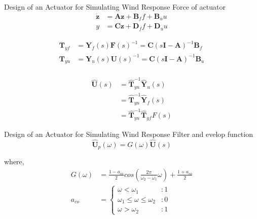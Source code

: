 \documentclass[usepdftitle=false]{beamer}
\newcommand{\matr}[1]{\mathbf{#1}}
\begin{document}
\begin{frame}{Design of an Actuator for Simulating Wind Response}
Force of actuator
\begin{equation}
\begin{aligned}
\dot{\matr{z}} &=\matr{A}\matr{z}+\matr{B}_{f}f + \matr{B}_{u}u \\
y &= \matr{C}\matr{z}+\matr{D}_{f}f+\matr{D}_{u}u
\end{aligned}
\label{eq:6-1}
\end{equation}

\begin{equation}
\begin{aligned}
\matr{T}_{yf} &= \matr{Y}_{f}(s)\matr{F}(s)^{-1} = \matr{C}\left(s\matr{I}-\matr{A}\right)^{-1}\matr{B}_{f} \\
\matr{T}_{yu} &= \matr{Y}_{u}(s)\matr{U}(s)^{-1} = \matr{C}\left(s\matr{I}-\matr{A}\right)^{-1}\matr{B}_{u} \\
\end{aligned}
\label{eq:6-2}
\end{equation}

\begin{equation}
\begin{aligned}
\hat{\matr{U}}(s)&=\hat{\matr{T}}_{yu}^{-1}\hat{\matr{Y}}_{u}(s)\\
&=\hat{\matr{T}}_{yu}^{-1}\hat{\matr{Y}}_{f}(s)\\
&=\hat{\matr{T}}_{yu}^{-1}\hat{\matr{T}}_{yf}F(s)
\end{aligned}
\label{eq:6-4}
\end{equation}

\end{frame}


\begin{frame}{Design of an Actuator for Simulating Wind Response}
Filter and evelop function
\begin{equation}\label{eq:6-5}
\hat{\matr{U}}_{p}(\omega) = G(\omega)\hat{\matr{U}}(s)
\end{equation}

where,
\begin{align}
G(\omega) &= \frac{1-a_{co}}{2}cos \left( \frac{2\pi}{\omega_{2}-\omega_{1}}\omega \right) + \frac{1+a_{co}}{2}\label{eq:6-6}\\
a_{co} &=\left\{\begin{array}{lr} \omega < \omega_{1} &: 1 \\ \omega_{1} \leq \omega \leq \omega_{2} &: 0 \\ \omega > \omega_{2} &: 1\end{array} \right.
\label{eq:6-7}
\end{align}
\end{frame}
\end{document}
